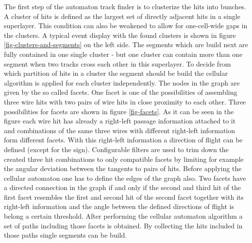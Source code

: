 The first step of the automaton track finder is to clusterize the hits into bunches. A cluster of hits is defined as the largest set of directly adjacent hits in a single superlayer. This condition can also be weakened to allow for one-cell-wide gaps in the clusters. A typical event display with the found clusters is shown in figure \ref{fig-clusters-and-segments} on the left side. The segments which are build next are fully contained in one single cluster - but one cluster can contain more than one segment when two tracks cross each other in this superlayer. To decide from which partition of hits in a cluster the segment should be build the cellular algorithm is applied for each cluster independently. The nodes in the graph are given by the so called facets. One facet is one of the possibilities of assembling three wire hits with two pairs of wire hits in close proximity to each other. Three possibilities for facets are shown in figure \ref{fig-facets}. As it can be seen in the figure each wire hit has already a right-left passage information attached to it and combinations of the same three wires with different right-left information form different facets. With this right-left information a direction of flight can be defined (except for the sign). Configurable filters are used to trim down the created three hit combinations to only compatible facets by limiting for example the angular deviation between the tangents to pairs of hits. Before applying the cellular automaton one has to define the edges of the graph also. Two facets have a directed connection in the graph if and only if the second and third hit of the first facet resembles the first and second hit of the second facet together with its right-left information and the angle between the defined directions of flight is belong a certain threshold. After performing the cellular automaton algorithm a set of paths including those facets is obtained. By collecting the hits included in those paths single segments can be build.

